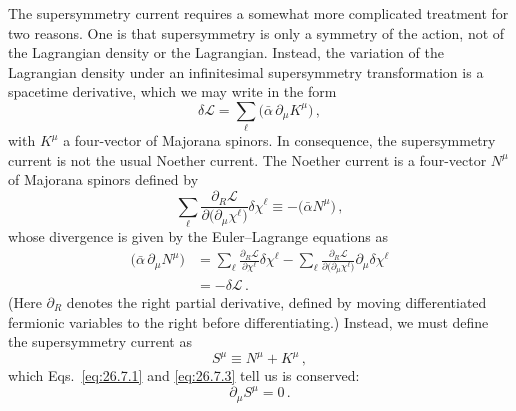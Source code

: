 The supersymmetry current requires a somewhat more complicated treatment for
two reasons. One is that supersymmetry is only a symmetry of the action, not
of the Lagrangian density or the Lagrangian. Instead, the variation of the
Lagrangian density under an infinitesimal supersymmetry transformation is a
spacetime derivative, which we may write in the form
\begin{equation}
  \delta\mathcal{L}
  =\sum_\ell\bigl(\bar\alpha\,\partial_\mu K^\mu\bigr)\,,
  \tag{26.7.1}\label{eq:26.7.1}
\end{equation}
with \(K^\mu\) a four-vector of Majorana spinors. In consequence, the
supersymmetry current is not the usual Noether current. The Noether current is
a four-vector \(N^\mu\) of Majorana spinors defined by
\begin{equation}
  \sum_\ell
  \frac{\partial_R\mathcal{L}}
       {\partial\bigl(\partial_\mu\chi^\ell\bigr)}
  \delta\chi^\ell
  \equiv-\bigl(\bar\alpha N^\mu\bigr)\,,
  \tag{26.7.2}\label{eq:26.7.2}
\end{equation}
whose divergence is given by the Euler--Lagrange equations as
\begin{equation}
  \begin{aligned}
  \bigl(\bar\alpha\,\partial_\mu N^\mu\bigr)
  &=
  \sum_\ell\frac{\partial_R\mathcal{L}}{\partial\chi^\ell}
  \delta\chi^\ell
  -\sum_\ell
  \frac{\partial_R\mathcal{L}}
       {\partial\bigl(\partial_\mu\chi^\ell\bigr)}
  \partial_\mu\delta\chi^\ell
  \\
  &=-\delta\mathcal{L}\,.
  \end{aligned}
  \tag{26.7.3}\label{eq:26.7.3}
\end{equation}
(Here \(\partial_R\) denotes the right partial derivative, defined by moving
differentiated fermionic variables to the right before differentiating.)
Instead, we must define the supersymmetry current as
\begin{equation}
  S^\mu\equiv N^\mu+K^\mu\,,
  \tag{26.7.4}\label{eq:26.7.4}
\end{equation}
which Eqs.~\eqref{eq:26.7.1} and \eqref{eq:26.7.3} tell us is conserved:
\begin{equation}
  \partial_\mu S^\mu=0\,.
  \tag{26.7.5}\label{eq:26.7.5}
\end{equation}

